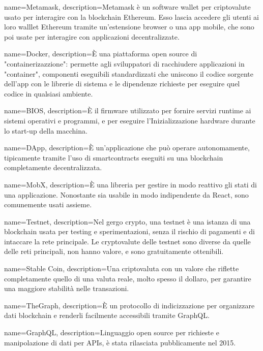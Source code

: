 {
  name={Metamask},
  description={Metamask è un software wallet per criptovalute usato per interagire con la blockchain Ethereum. Esso lascia accedere gli utenti ai loro walllet Ethereum tramite un'estensione browser o una app mobile, che sono poi usate per interagire con applicazioni decentralizzate.}
}

{
  name={Docker},
  description={È una piattaforma open source di "containerizazzione": permette agli sviluppatori di racchiudere applicazioni in "container", componenti eseguibili standardizzati che uniscono il codice sorgente dell'app con le librerie di sistema e le dipendenze richieste per eseguire quel codice in qualsiasi ambiente.}
}

{
  name={BIOS},
  description={È il firmware utilizzato per fornire servizi runtime ai sistemi operativi e programmi, e per eseguire l'Inizializzazione hardware durante lo start-up della macchina.}
}

{
  name={DApp},
  description={È un'applicazione che può operare autonomamente, tipicamente tramite l'uso di smartcontracts eseguiti su una blockchain completamente decentralizzata.}
}

{
  name={MobX},
  description={È una libreria per gestire in modo reattivo gli stati di una applicazione. Nonostante sia usabile in modo indipendente da React, sono comunemente usati assieme.}
}

{
  name={Testnet},
  description={Nel gergo crypto, una testnet è una istanza di una blockchain usata per testing e sperimentazioni, senza il rischio di pagamenti e di intaccare la rete principale. Le cryptovalute delle testnet sono diverse da quelle delle reti principali, non hanno valore, e sono gratuitamente ottenibili.}
}

{
  name={Stable Coin},
  description={Una criptovaluta con un valore che riflette completamente quello di una valuta reale, molto spesso il dollaro, per garantire una maggiore stabilità nelle transazioni.}
}

{
  name={TheGraph},
  description={È un protocollo di indicizzazione per organizzare dati blockchain e renderli facilmente accessibili tramite GraphQL\glo.}
}

{
  name={GraphQL},
  description={Linguaggio open source per richieste e manipolazione di dati per APIs\glo, è stata rilasciata pubblicamente nel 2015.}
}

